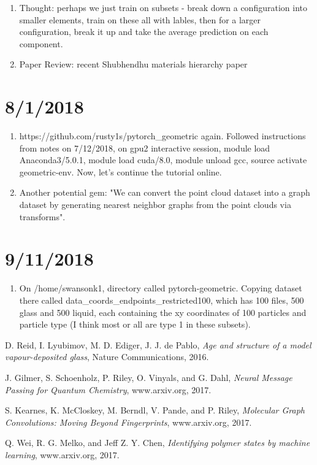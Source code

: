 \documentclass[12pt,reqno]{amsart}
\numberwithin{equation}{section}
\begin{document}
\begin{enumerate}
\item Thought: perhaps we just train on subsets - break down a configuration into smaller elements, train on these all with lables, then for a larger configuration, break it up and take the average prediction on each component.  

\item Paper Review: recent Shubhendhu materials hierarchy paper
\end{enumerate}

\section{8/1/2018}
\begin{enumerate}
\item https://github.com/rusty1s/pytorch\_geometric again.  Followed instructions from notes on 7/12/2018, on gpu2 interactive session, module load Anaconda3/5.0.1, module load cuda/8.0, module unload gcc, source activate geometric-env.  Now, let's continue the tutorial online.  
\item Another potential gem: "We can convert the point cloud dataset into a graph dataset by generating nearest neighbor graphs from the point clouds via transforms".  
\end{enumerate}

\section{9/11/2018}
\begin{enumerate}
\item On /home/swansonk1, directory called pytorch-geometric.  Copying dataset there called data\_coords\_endpoints\_restricted100, which has 100 files, 500 glass and 500 liquid, each containing the xy coordinates of 100 particles and particle type (I think most or all are type 1 in these subsets).  
\end{enumerate}


\begin{thebibliography}{Al-F11}
D. Reid, I. Lyubimov, M. D. Ediger, J. J. de Pablo, \textit{Age and structure of a model vapour-deposited glass}, Nature Communications, 2016. 

 J. Gilmer, S. Schoenholz, P. Riley, O. Vinyals, and G. Dahl, \textit{Neural Message Passing for Quantum Chemistry}, www.arxiv.org, 2017.  

S. Kearnes, K. McCloskey, M. Berndl, V. Pande, and P. Riley, \textit{Molecular Graph Convolutions: Moving Beyond Fingerprints}, www.arxiv.org, 2017.

Q. Wei, R. G. Melko, and Jeff Z. Y. Chen, \textit{Identifying polymer states by machine learning}, www.arxiv.org, 2017.  

\end{thebibliography}
\end{document}
